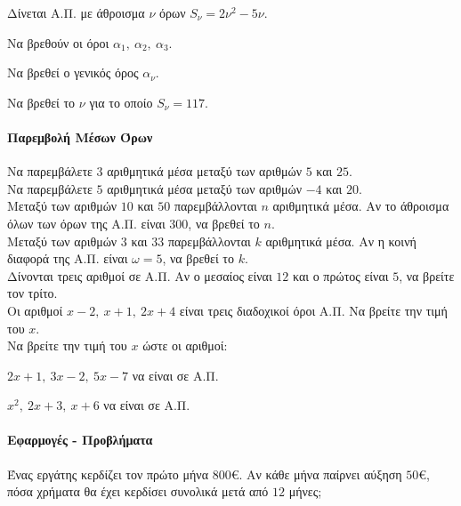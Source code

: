 \documentclass[11pt,a4paper,modern]{FFExercises}
\begin{document}
\askhsh Δίνεται Α.Π. με άθροισμα $\nu$ όρων $S_{\nu}=2\nu^2-5\nu$.
\begin{alist}
\item Να βρεθούν οι όροι $\alpha_1,\ \alpha_2,\ \alpha_3$.
\item Να βρεθεί ο γενικός όρος $\alpha_{\nu}$.
\item Να βρεθεί το $\nu$ για το οποίο $S_{\nu}=117$.
\end{alist}

\paragraph{Παρεμβολή Μέσων Όρων}

\askhsh Να παρεμβάλετε $3$ αριθμητικά μέσα μεταξύ των αριθμών $5$ και $25$.\\

\askhsh Να παρεμβάλετε $5$ αριθμητικά μέσα μεταξύ των αριθμών $-4$ και $20$.\\

\askhsh Μεταξύ των αριθμών $10$ και $50$ παρεμβάλλονται $n$ αριθμητικά μέσα. Αν το άθροισμα όλων των όρων της Α.Π. είναι $300$, να βρεθεί το $n$.\\

\askhsh Μεταξύ των αριθμών $3$ και $33$ παρεμβάλλονται $k$ αριθμητικά μέσα. Αν η κοινή διαφορά της Α.Π. είναι $\omega=5$, να βρεθεί το $k$.\\

\askhsh Δίνονται τρεις αριθμοί σε Α.Π. Αν ο μεσαίος είναι $12$ και ο πρώτος είναι $5$, να βρείτε τον τρίτο.\\

\askhsh Οι αριθμοί $x-2,\ x+1,\ 2x+4$ είναι τρεις διαδοχικοί όροι Α.Π. Να βρείτε την τιμή του $x$.\\

\askhsh Να βρείτε την τιμή του $x$ ώστε οι αριθμοί:
\begin{alist}
\item $2x+1,\ 3x-2,\ 5x-7$ να είναι σε Α.Π.
\item $x^2,\ 2x+3,\ x+6$ να είναι σε Α.Π.
\end{alist}

\paragraph{Εφαρμογές - Προβλήματα}

\askhsh Ένας εργάτης κερδίζει τον πρώτο μήνα $800$\euro. Αν κάθε μήνα παίρνει αύξηση $50$\euro, πόσα χρήματα θα έχει κερδίσει συνολικά μετά από $12$ μήνες;\\
\end{document}
